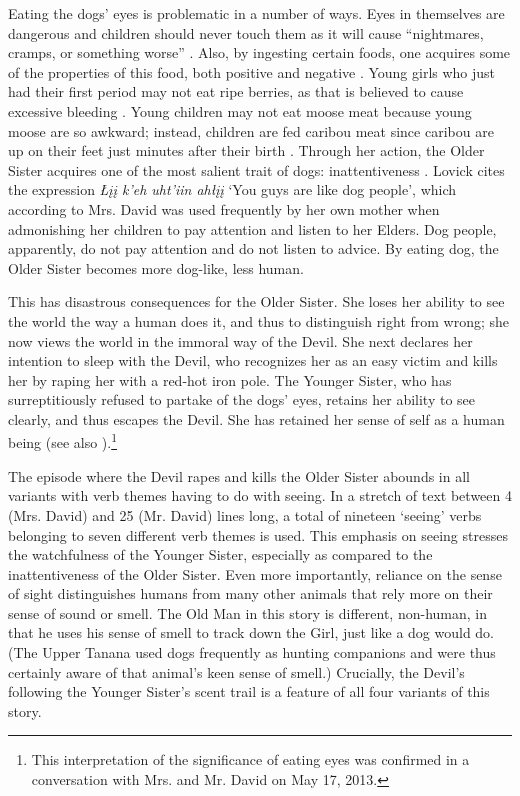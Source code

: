 Eating the dogs' eyes is problematic in a number of ways. Eyes in themselves are dangerous and children should never touch them as it will cause ``nightmares, cramps, or something worse'' \citep[177]{GuedonM1974}. Also, by ingesting certain foods, one acquires some of the properties of this food, both positive and negative \citep[233]{NelsonR1983}. Young girls who just had their first period may not eat ripe berries, as that is believed to cause excessive bleeding \citep[21]{TyoneM1996}. Young children may not eat moose meat because young moose are so awkward; instead, children are fed caribou meat since caribou are up on their feet just minutes after their birth \citep{DavidCforthc}. Through her action, the Older Sister acquires one of the most salient trait of dogs: inattentiveness \citep[104, 110]{LovickO2012a-metaphor}. Lovick cites the expression {\em Łįį k'eh uht'iin ahłįį} `You guys are like dog people', which according to Mrs. David was used frequently by her own mother when admonishing her children to pay attention and listen to her Elders. Dog people, apparently, do not pay attention and do not listen to advice. By eating dog, the Older Sister becomes more dog-like, less human.

This has disastrous consequences for the Older Sister. She loses her ability to see the world the way a human does it, and thus to distinguish right from wrong; she now views the world in the immoral way of the Devil. She next declares her intention to sleep with the Devil, who recognizes her as an easy victim and kills her by raping her with a red-hot iron pole. The Younger Sister, who has surreptitiously refused to partake of the dogs' eyes, retains her ability to see clearly, and thus escapes the Devil. She has retained her sense of self as a human being (see also \citealp[470]{GuedonMF2005}).\footnote{This interpretation of the significance of eating eyes was confirmed in a conversation with Mrs. and Mr. David on May 17, 2013.}

The episode where the Devil rapes and kills the Older Sister abounds in all variants with verb themes having to do with seeing. In a stretch of text between 4 (Mrs. David) and 25 (Mr. David) lines long, a total of nineteen `seeing' verbs belonging to seven different verb themes is used. This emphasis on seeing stresses the watchfulness of the Younger Sister, especially as compared to the inattentiveness of the Older Sister. Even more importantly, reliance on the sense of sight distinguishes humans from many other animals that rely more on their sense of sound or smell. The Old Man in this story is different, non-human, in that he uses his sense of smell to track down the Girl, just like a dog would do. (The Upper Tanana used dogs frequently as hunting companions and were thus certainly aware of that animal's keen sense of smell.) Crucially, the Devil's following the Younger Sister's scent trail is a feature of all four variants of this story.

